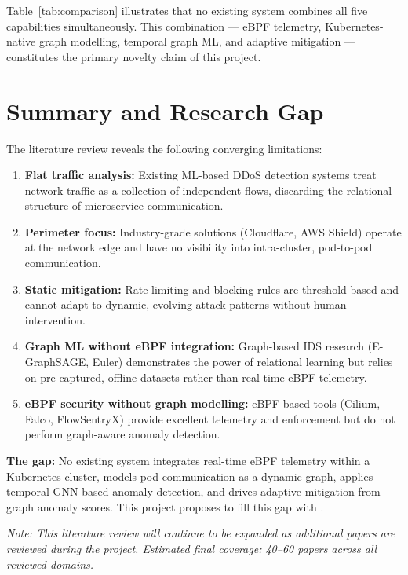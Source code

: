 \noindent Table~\ref{tab:comparison} illustrates that no existing system combines all five
capabilities simultaneously. This combination --- eBPF telemetry, Kubernetes-native graph
modelling, temporal graph ML, and adaptive mitigation --- constitutes the primary novelty
claim of this project.

\section{Summary and Research Gap}
\label{sec:lit_gap}

The literature review reveals the following converging limitations:

\begin{enumerate}
  \item \textbf{Flat traffic analysis:} Existing ML-based DDoS detection systems treat
  network traffic as a collection of independent flows, discarding the relational structure
  of microservice communication.

  \item \textbf{Perimeter focus:} Industry-grade solutions (Cloudflare, AWS Shield) operate
  at the network edge and have no visibility into intra-cluster, pod-to-pod communication.

  \item \textbf{Static mitigation:} Rate limiting and blocking rules are threshold-based and
  cannot adapt to dynamic, evolving attack patterns without human intervention.

  \item \textbf{Graph ML without eBPF integration:} Graph-based IDS research
  (E-GraphSAGE, Euler) demonstrates the power of relational learning but relies on
  pre-captured, offline datasets rather than real-time eBPF telemetry.

  \item \textbf{eBPF security without graph modelling:} eBPF-based tools (Cilium, Falco,
  FlowSentryX) provide excellent telemetry and enforcement but do not perform
  graph-aware anomaly detection.
\end{enumerate}

\textbf{The gap:} No existing system integrates real-time eBPF telemetry within a
Kubernetes cluster, models pod communication as a dynamic graph, applies temporal GNN-based
anomaly detection, and drives adaptive mitigation from graph anomaly scores. This project
proposes to fill this gap with \sys{}.

\bigskip
\noindent \textit{Note: This literature review will continue to be expanded as additional
papers are reviewed during the project. Estimated final coverage: 40--60 papers across all
reviewed domains.}
